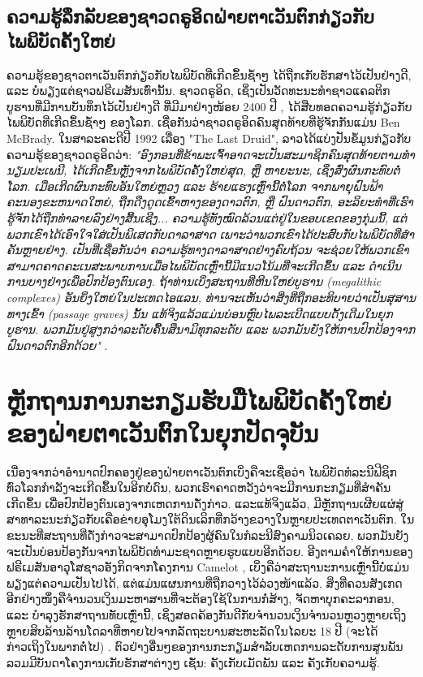 \documentclass[10pt,twocolumn,letterpaper]{article}
\begin{document}
\subsection{ຄວາມຮູ້ລຶກລັບຂອງຊາວດຣູອິດຝ່າຍຕາເວັນຕົກກ່ຽວກັບໄພພິບັດຄັ້ງໃຫຍ່}

ຄວາມຮູ້ຂອງຊາວຕາເວັນຕົກກ່ຽວກັບໄພພິບັດທີ່ເກີດຂຶ້ນຊ້ຳໆ ໄດ້ຖືກເກັບຮັກສາໄວ້ເປັນຢ່າງດີ, ແລະ ບໍ່ພຽງແຕ່ຊາວຟຣີເມສັນເທົ່ານັ້ນ. ຊາວດຣູອິດ, ເຊິ່ງເປັນວັດທະນະທໍາຊາວແຄລຕິກບູຮານທີ່ມີການບັນທຶກໄວ້ເປັນຢ່າງດີ ທີ່ມີມາຢ່າງໜ້ອຍ 2400 ປີ  \cite{7}, ໄດ້ສືບທອດຄວາມຮູ້ກ່ຽວກັບໄພພິບັດທີ່ເກີດຂຶ້ນຊ້ຳໆ ຂອງໂລກ. ເຊື່ອກັນວ່າຊາວດຣູອິດຄົນສຸດທ້າຍທີ່ຮູ້ຈັກກັນແມ່ນ Ben McBrady.
ໃນສາລະຄະດີປີ 1992 ເລື່ອງ  "The Last Druid", ລາວໄດ້ແບ່ງປັນຂໍ້ມູນກ່ຽວກັບຄວາມຮູ້ຂອງຊາວດຣູອິດວ່າ: \textit{"ອົງກອນທີ່ຂ້າພະເຈົ້າອາດຈະເປັນສະມາຊິກຄົນສຸດທ້າຍຕາມທໍານຽມປະເພນີ, ໄດ້ເກີດຂຶ້ນຫຼັງຈາກໄພພິບັດຄັ້ງໃຫຍ່ສຸດ, ຫຼື ຫາຍະນະ, ເຊິ່ງສົ່ງຜົນກະທົບຕໍ່ໂລກ. ເມື່ອເກີດຜົນກະທົບອັນໃຫຍ່ຫຼວງ ແລະ ຮ້າຍແຮງເຫຼົ່ານີ້ຕໍ່ໂລກ ຈາກພາຍຸຝົນຟ້າຄະນອງຂະຫນາດໃຫຍ່, ຖືກດືງດູດເຂົ້າຫາງຂອງດາວຕົກ, ຫຼື ຝົນດາວຕົກ, ອະລິຍະທໍາທີ່ເຮົາຮູ້ຈັກໄດ້ຖືກທໍາລາຍລົງຢ່າງສິ້ນເຊີງ... ຄວາມຮູ້ທັງໝົດລ້ວນແຕ່ຢູ່ໃນຂອບເຂດຂອງກຸ່ມນີ້, ແຕ່ພວກເຂົາໄດ້ເອົາໃຈໃສ່ເປັນພິເສດກັບດາລາສາດ ເພາະວ່າພວກເຂົາໄດ້ປະສົບກັບໄພພິບັດທີ່ສໍາຄັນຫຼາຍຢ່າງ. ເປັນທີ່ເຊື່ອກັນວ່າ ຄວາມຮູ້ທາງດາລາສາດຢ່າງຄົບຖ້ວນ ຈະຊ່ວຍໃຫ້ພວກເຂົາສາມາດຄາດຄະເນສະພາບການເມື່ອໄພພິບັດເຫຼົ່ານີ້ມີແນວໂນ້ມທີ່ຈະເກີດຂຶ້ນ ແລະ ດໍາເນີນການບາງຢ່າງເພື່ອປົກປ້ອງຕົນເອງ. ຖ້າທ່ານເບິ່ງສະຖານທີ່ຫີນໃຫຍ່ບູຮານ (megalithic complexes) ອັນຍິ່ງໃຫຍ່ໃນປະເທດໄອແລນ, ທ່ານຈະເຫັນວ່າສິ່ງທີ່ຖືກອະທິບາຍວ່າເປັນສຸສານທາງເຂົ້າ (passage graves) ນັ້ນ ແທ້ຈິງແລ້ວແມ່ນບ່ອນຫຼົບໄພລະເບີດແບບດັ້ງເດີມໃນຍຸກບູຮານ. ພວກມັນຢູ່ສູງກວ່າລະດັບຄື້ນສຶນາມິທຸກລະດັບ ແລະ ພວກມັນຍັງໃຫ້ການປົກປ້ອງຈາກຝົນດາວຕົກອີກດ້ວຍ"} \cite{8,9}.

\section{ຫຼັກຖານການກະກຽມຮັບມືໄພພິບັດຄັ້ງໃຫຍ່ຂອງຝ່າຍຕາເວັນຕົກໃນຍຸກປັດຈຸບັນ}

ເນື່ອງຈາກວ່າອຳນາດປົກຄອງຢູ່ຂອງຝ່າຍຕາເວັນຕົກເບິ່ງຄືຈະເຊື່ອວ່າ ໄພພິບັດທໍລະນີຟີຊິກທົ່ວໂລກກຳລັງຈະເກີດຂຶ້ນໃນອີກບໍ່ດົນ, ພວກເຮົາຄາດຫວັງວ່າຈະມີການກະກຽມທີ່ສຳຄັນເກີດຂຶ້ນ ເພື່ອປົກປ້ອງຕົນເອງຈາກເຫດການດັ່ງກ່າວ. ແລະແທ້ຈິງແລ້ວ, ມີຫຼັກຖານເຜີຍແຜ່ສູ່ສາທາລະນະກ່ຽວກັບເຄືອຂ່າຍອຸໂມງໃຕ້ດິນເລິກທີ່ກວ້າງຂວາງໃນຫຼາຍປະເທດຕາເວັນຕົກ. ໃນຂະນະທີ່ສະຖານທີ່ດັ່ງກ່າວຈະສາມາດປົກປ້ອງຜູ້ຄົນໃນກໍລະນີສົງຄາມນິວເຄລຍ, ພວກມັນຍັງຈະເປັນບ່ອນປ້ອງກັນຈາກໄພພິບັດທໍາມະຊາດຫຼາຍຮູບແບບອີກດ້ວຍ.
ອີງຕາມຄຳໃຫ້ການຂອງຟຣີເມສັນອາວຸໂສຊາວອັງກິດຈາກໂຄງການ Camelot \cite{4,6}, ເບິ່ງຄືວ່າສະຖານະການເຫຼົ່ານີ້ບໍ່ແມ່ນພຽງແຕ່ຄວາມເປັນໄປໄດ້, ແຕ່ແມ່ນແຜນການທີ່ຖືກວາງໄວ້ລ່ວງໜ້າແລ້ວ. ສິ່ງທີ່ຄວນສັງເກດອີກຢ່າງໜຶ່ງຄືຈໍານວນເງິນມະຫາສານທີ່ຈະຕ້ອງໃຊ້ໃນການກໍ່ສ້າງ, ຈັດຫາບຸກຄະລາກອນ, ແລະ ບໍາລຸງຮັກສາຖານທັບເຫຼົ່ານີ້, ເຊິ່ງສອດຄ້ອງກັນດີກັບຈໍານວນເງິນຈໍານວນຫຼວງຫຼາຍເຖິງຫຼາຍສິບລ້ານລ້ານໂດລາທີ່ຫາຍໄປຈາກລັດຖະບານສະຫະລັດໃນໄລຍະ 18 ປີ (ຈະໄດ້ກ່າວເຖິງໃນພາກຕໍ່ໄປ) \cite{11,12,13}. 
ຕົວຢ່າງອື່ນໆຂອງການກະກຽມສຳລັບເຫດການລະດັບການສູນພັນ ລວມມີບັນດາໂຄງການເກັບຮັກສາຕ່າງໆ ເຊັ່ນ: ຄັງເກັບເມັດພັນ ແລະ ຄັງເກັບຄວາມຮູ້. 
\end{document}
